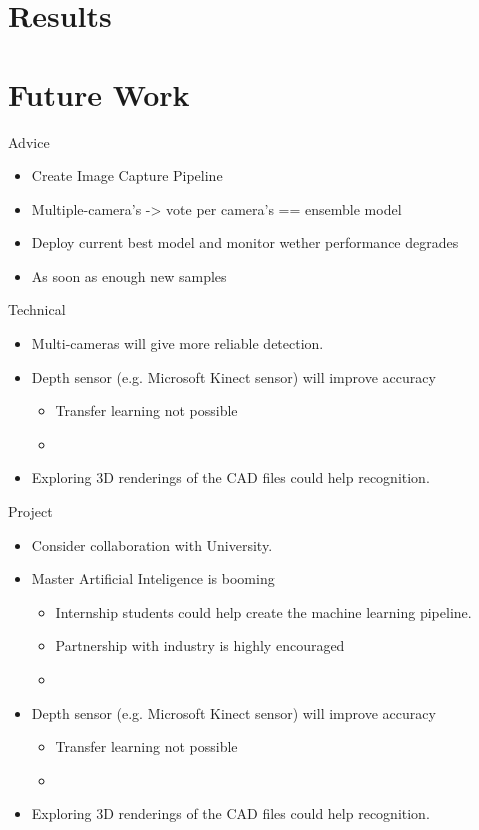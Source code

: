 \documentclass{beamer}
\begin{document}
\section{Results}
\section{Future Work}
\begin{frame}{Advice}
\begin{itemize}
  \item Create Image Capture Pipeline
  \item Multiple-camera's -> vote per camera's == ensemble model
  \item Deploy current best model and monitor wether performance degrades
  \item As soon as enough new samples 
\end{itemize}
\end{frame}{}
\begin{frame}{Technical}
\begin{itemize}
 \item Multi-cameras will give more reliable detection.
 \item Depth sensor (e.g. Microsoft Kinect sensor) will improve accuracy 
  \begin{itemize}
  \item Transfer learning not possible
  \item 
  \end{itemize}
 \item Exploring 3D renderings of the CAD files could help recognition.
\end{itemize}
\end{frame}

\begin{frame}{Project}
\begin{itemize}
 \item Consider collaboration with University.
 \item Master Artificial Inteligence is booming
  \begin{itemize}
  \item Internship students could help create the machine learning pipeline.
  \item Partnership with industry is highly encouraged
  \item  
  \end{itemize}
 \item Depth sensor (e.g. Microsoft Kinect sensor) will improve accuracy 
  \begin{itemize}
  \item Transfer learning not possible
  \item 
  \end{itemize}
 \item Exploring 3D renderings of the CAD files could help recognition.
\end{itemize}
\end{frame}
\end{document}
